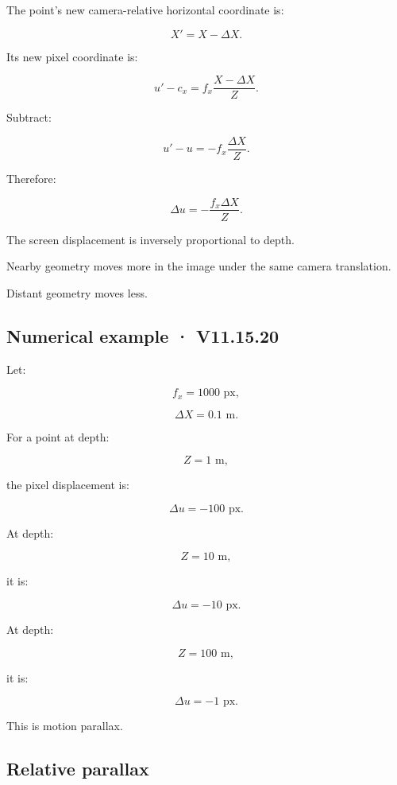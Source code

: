 The point's new camera-relative horizontal coordinate is:

\[ X'=X-\Delta X. \]

Its new pixel coordinate is:

\[ u'-c_x=f_x\frac{X-\Delta X}{Z}. \]

Subtract:

\[ u'-u=-f_x\frac{\Delta X}{Z}. \]

Therefore:

\[ \boxed{ \Delta u=-\frac{f_x\Delta X}{Z}. } \]

The screen displacement is inversely proportional to depth.

Nearby geometry moves more in the image under the same camera translation.

Distant geometry moves less.

\subsection{Numerical example · V11.15.20}\label{02-foundations-ii-ch035-numerical-example-v11.15.20}

\hypertarget{02-foundations-ii-ch035-numerical-example-v11.15.20}{}

Let:

\[ f_x=1000\text{ px}, \]

\[ \Delta X=0.1\text{ m}. \]

For a point at depth:

\[ Z=1\text{ m}, \]

the pixel displacement is:

\[ \boxed{\Delta u=-100\text{ px}}. \]

At depth:

\[ Z=10\text{ m}, \]

it is:

\[ \boxed{\Delta u=-10\text{ px}}. \]

At depth:

\[ Z=100\text{ m}, \]

it is:

\[ \boxed{\Delta u=-1\text{ px}}. \]

This is motion parallax.

\subsection{Relative parallax}\label{02-foundations-ii-ch035-relative-parallax}

\hypertarget{02-foundations-ii-ch035-relative-parallax}{}

